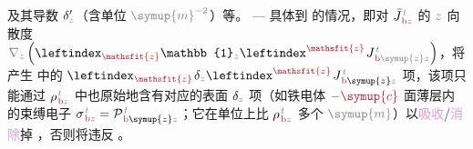 及其导数 $\delta'_{\mathcolor{gray}{z}}$（含单位 $\mathcolor{gray}{\symup{m}^{-2}}$）等。 ---  具体到  的情况，即对 $\bar{J}^{\;\!\mathcolor{gray}{t}}_{\;\!\textcolor{Maroon}{\text{b}}\mathcolor{gray}{z}}$ 的 $\mathcolor{gray}{z}$ 向散度 $\mathcolor{gray}{\nabla_z} \left( \leftindex_{\textcolor{Maroon}{\mathsfit{z}}} {\mathbb{1}}_{\mathcolor{gray}{z}} \leftindex^{\textcolor{Maroon}{\mathsfit{z}}} \;\! J^{\;\!\mathcolor{gray}{t}}_{\;\!\textcolor{Maroon}{\text{b}} \mathcolor{gray}{\symup{z}} \mathcolor{gray}{z}} \right)$，将产生  中的 $\leftindex_{\textcolor{Maroon}{\mathsfit{z}}} \;\! \delta_{\mathcolor{gray}{z}} \leftindex^{\textcolor{Maroon}{\mathsfit{z}}} \;\! J^{\;\!\mathcolor{gray}{t}}_{\;\!\textcolor{Maroon}{\text{b}} \symup{z} \mathcolor{gray}{z}}$ 项，该项只能通过 ${\rho}^{\;\!\mathcolor{gray}{t}}_{\;\!\textcolor{Maroon}{\text{b}}\mathcolor{gray}{z}}$ 中也原始地含有对应的表面 $\delta_{\mathcolor{gray}{z}}$ 项（如铁电体 $\textcolor{Maroon}{-\symup{c}}$ 面薄层内的束缚电子 ${\sigma}^{\;\!\mathcolor{gray}{t}}_{\;\!\textcolor{Maroon}{\text{b}}\mathcolor{gray}{z}} = {\mathcal{P}}^{\;\!\mathcolor{gray}{t}}_{\;\!\textcolor{Maroon}{\text{b}} \symup{z} \mathcolor{gray}{z}}$；它在单位上比 ${\rho}^{\;\!\mathcolor{gray}{t}}_{\;\!\textcolor{Maroon}{\text{b}}\mathcolor{gray}{z}}$ 多个 $\mathcolor{gray}{\symup{m}}$）以\textcolor{Plum}{吸收}/\textcolor{Plum}{消除}掉 \cite{grahamMultipoleSolutionMacroscopic2000}，否则将违反 。

